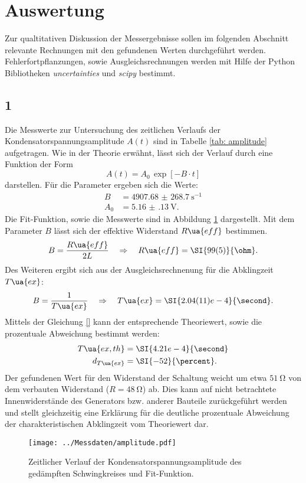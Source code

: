 \section{Auswertung}
Zur qualtitativen Diskussion der Messergebnisse sollen im folgenden Abschnitt relevante Rechnungen mit den gefundenen
Werten durchgeführt werden. Fehlerfortpflanzungen, sowie Ausgleichsrechnungen werden mit
Hilfe der Python Bibliotheken \emph{uncertainties}\cite{uncertainties} und \emph{scipy}\cite{scipy} bestimmt.
\subsection{1}
Die Messwerte zur Untersuchung des zeitlichen Verlaufs der Kondensatorspannungsamplitude $A(t)$ sind in Tabelle \ref{tab: amplitude} aufgetragen. Wie in der Theorie erwähnt,
lässt sich der Verlauf durch eine Funktion der Form
\begin{equation}
  A(t) = A_0 \, \exp[-B\cdot t]
\end{equation}
darstellen. Für die Parameter ergeben sich die Werte:
\begin{align}
  B &= \SI{4907.68(26870)}{\second^{-1}}\\
  A_0 &= \SI{5.16(13)}{\volt}.
\end{align}
Die Fit-Funktion, sowie die Messwerte sind in Abbildung \ref{fig: amplitude} dargestellt.
Mit dem Parameter $B$ lässt sich der effektive Widerstand $R\ua{eff}$ bestimmen.
\begin{equation}
  B = \frac{R\ua{eff}}{2L} \quad \Rightarrow \quad R\ua{eff} =  \SI{99(5)}{\ohm}.
  \label{eq: Fitparameter}
\end{equation}
Des Weiteren ergibt sich aus der Ausgleichsrechnenung für die Abklingzeit $T\ua{ex}$:
\begin{equation}
  B = \frac{1}{T\ua{ex}} \quad \Rightarrow \quad T\ua{ex} =  \SI{2.04(11)e-4}{\second}.
\end{equation}
Mittels der Gleichung \eqref{} kann der entsprechende Theoriewert, sowie die prozentuale Abweichung bestimmt werden:
\begin{align}
  \begin{aligned}
  T\ua{ex, th} &= \SI{4.21e-4}{\second}\\
  d_{T\ua{ex}} &= \SI{-52}{\percent}.
\end{aligned}
\label{eq: theo_breite}
\end{align}
Der gefundenen Wert für den
Widerstand der Schaltung weicht um etwa $\SI{51}{\ohm}$ von dem verbauten Widerstand ($R =  \SI{48}{\ohm}$) ab. Dies kann
auf nicht betrachtete Innenwiderstände des Generators bzw. anderer Bauteile zurückgeführt werden und stellt
gleichzeitig eine Erklärung für die deutliche prozentuale Abweichung der charakteristischen Abklingzeit vom Theoriewert dar.

\begin{figure}
  \centering
  \texttt{[image: ../Messdaten/amplitude.pdf]}
  \caption{Zeitlicher Verlauf der Kondensatorspannungsamplitude des gedämpften Schwingkreises und Fit-Funktion.}
  \label{fig: amplitude}
\end{figure}

